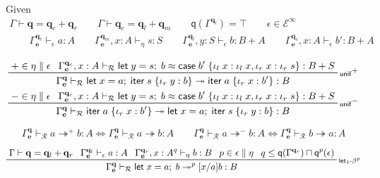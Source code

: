 \documentclass[acmsmall,screen,review]{acmart}
\newcommand{\mc}[1]{\ensuremath{\mathcal{#1}}}
\newcommand{\mb}[1]{\ensuremath{\mathbf{#1}}}
\newcommand{\ms}[1]{\ensuremath{\mathsf{#1}}}
\newcommand{\lto}{:}
\newcommand{\linl}[1]{\iota_l\;{#1}}
\newcommand{\linr}[1]{\iota_r\;{#1}}
\newcommand{\letexpr}[3]{\ensuremath{\ms{let}\;#1 = #2;\;#3}}
\newcommand{\caseexpr}[5]{\ms{case}\;#1\;\{\linl{#2} \lto #3, \linr{#4} \lto #5\}}
\newcommand{\liter}[3]{\ms{iter}\;#1\;\{ \linr{#2} \lto #3 \}}
\newcommand{\einf}[1]{#1 \in \mc{E}^\infty}
\newcommand{\qsp}[4]{#1 \vdash #2 = #3 + #4}
\newcommand{\rle}[1]{{\scriptsize\textsf{#1}}}
\newcommand{\hasty}[4]{#1 \vdash_{#2} #3: {#4}}
\newcommand{\teqv}{\approx}
\newcommand{\tref}{\twoheadrightarrow}
\newcommand{\tmle}[5]{#1 \vdash_{#2} #3 \tref #4 : {#5}}
\newcommand{\tmlep}[6]{#1 \vdash_{#2} #3 \tref^{#6} #4 : {#5}}
\newcommand{\tmeq}[5]{#1 \vdash_{#2} #3 \teqv #4 : {#5}}
\newcommand{\alquant}{\ms{q}}
\begin{document}
Given
\begin{gather*}
  {\qsp{\Gamma}{\mb{q}}{\mb{q}_c}{\mb{q}_r}} \qquad
  {\qsp{\Gamma}{\mb{q}_c}{\mb{q}_l}{\mb{q}_m}} \qquad
  \alquant(\Gamma^{\mb{q}_l}) = \top \qquad
  \einf{\epsilon}
  \\
  \qquad {\hasty{\Gamma^{\mb{q}_r}_{\mb{e}}}{\epsilon}{a}{A}}
  \qquad {\hasty{\Gamma^{\mb{q}_m}_{\mb{e}}, x : A}{\eta}{s}{S}}
  \qquad {\hasty{\Gamma^{\mb{q}_l}_{\mb{e}}, y : S}{\epsilon}{b}{B + A}}
  \qquad {\hasty{\Gamma^{\mb{q}_c}_{\mb{e}}, x : A}{\epsilon}{b'}{B + A}}
\end{gather*}

\begin{gather*}
  \prftree[r]{\rle{unif}$^+$}
    {+ \in \eta \parallel \epsilon}
    {\tmeq{\Gamma^{\mb{q}_c}_{\mb{e}}, x : A}{\mc{R}}
      {\letexpr{y}{s}{b}}
      {\caseexpr{b'}{x}{\linl{x}}{x}{\linr{s}}}{B + S}}
    {
      \tmle{\Gamma^{\mb{q}}_{\mb{e}}}
        {\mc{R}}
        {\letexpr{x}{a}{\liter{s}{y}{b}}}
        {\liter{a}{x}{b'}}
        {B}
    } \\
  \prftree[r]{\rle{unif}$^-$}
    {- \in \eta \parallel \epsilon}
    {\tmeq{\Gamma^{\mb{q}_c}_{\mb{e}}, x : A}{\mc{R}}
      {\letexpr{y}{s}{b}}
      {\caseexpr{b'}{x}{\linl{x}}{x}{\linr{s}}}{B + S}}
    {
      \tmle{\Gamma^{\mb{q}}_{\mb{e}}}
        {\mc{R}}
        {\liter{a}{x}{b'}}
        {\letexpr{x}{a}{\liter{s}{y}{b}}}
        {B}
    }
\end{gather*}

\begin{equation*}
  \tmlep{\Gamma^{\mb{q}}_{\mb{e}}}{\mc{R}}{a}{b}{A}{+}
  \iff \tmle{\Gamma^{\mb{q}}_{\mb{e}}}{\mc{R}}{a}{b}{A}
  \qquad
  \tmlep{\Gamma^{\mb{q}}_{\mb{e}}}{\mc{R}}{a}{b}{A}{-}
  \iff \tmle{\Gamma^{\mb{q}}_{\mb{e}}}{\mc{R}}{b}{a}{A}
\end{equation*}

\begin{gather*}
  \prftree[r]{\rle{let$_1$-$\beta^p$}}
    {\qsp{\Gamma}{\mb{q}}{\mb{q}_l}{\mb{q}_r}}
    {\hasty{\Gamma^{\mb{q}_l}_{\mb{e}}}{\epsilon}{a}{A}}
    {\hasty{\Gamma^{\mb{q}_r}_{\mb{e}}, x : A^q}{\eta}{b}{B}}
    {p \in \epsilon \parallel \eta}
    {q \leq \alquant(\Gamma^{\mb{q}_r}) \sqcap \alquant^p(\epsilon)}
    {
      \tmlep{\Gamma^{\mb{q}}_{\mb{e}}}{\mc{R}}{\letexpr{x}{a}{b}}{[x/a]b}{B}{p}
    }
\end{gather*}
\end{document}
